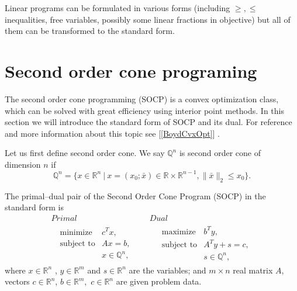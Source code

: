 \documentclass[12pt]{book}
\theoremstyle{definition}
\begin{document}
\rem Linear programs can be formulated in various forms (including $\geq , \leq$ inequalities, free variables, possibly some linear fractions in objective) but all of them can be transformed to the standard form.
%


\section{Second order cone programing}
\label{SectionSOCP}


The second order cone programming (SOCP) is a convex optimization class, which can be solved with great efficiency using interior point methods. 
In this section we will introduce the standard form of SOCP and its dual. For reference and more information about this topic see [\ref{BoydCvxOpt}] .


Let us first define second order cone.
\label{defSOC} We say $\mathbb{Q}^n$ is second order cone of dimension $n$ if 
\begin{equation*}
\mathbb{Q}^n=\{x\in \mathbb{R}^n \ | \ x = (x_0;\bar{x}) \in \mathbb{R}\times\mathbb{R}^{n-1}, \|\bar{x}\|_2\leq x_0\}.
\end{equation*}


\label{defSOCP}
The primal--dual pair of the Second Order Cone Program (SOCP) in the standard form is
\begin{equation}
\label{socp} 
\begin{array}{cc}
Primal & Dual \\
\ \ \ \begin{array}{ll}
\mbox{minimize} & c^Tx,\\
\mbox{subject to}& Ax = b,\\
& x \in \mathbb{Q}^n,
\end{array} 
 \ \ \ \ \ & \ \ \ \ \ 
 \begin{array}{ll}
\mbox{maximize} & b^Ty,\\
\mbox{subject to}& A^Ty + s = c,\\
& s \in \mathbb{Q}^n,
\end{array}
\end{array}
\end{equation}
where $x\in \mathbb{R}^n$ , $y\in \mathbb{R}^m$ and $s\in \mathbb{R}^n$ are the variables; and $m\times n$ real matrix $A$, vectors $c\in \mathbb{R}^n$, $b\in \mathbb{R}^{m},$ $c\in \mathbb{R}^n$ are given problem data.
\end{document}
